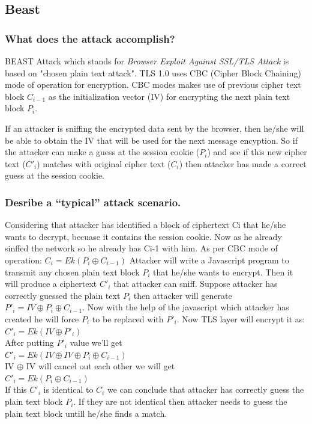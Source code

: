 \documentclass{article}
\begin{document}
\subsection{Beast}
\subsubsection{What does the attack accomplish?}

\indent \indent BEAST Attack which stands for {\it Browser Exploit Against SSL/TLS Attack} is based on "chosen plain text attack". TLS 1.0 uses CBC (Cipher Block Chaining) mode of operation for encryption. CBC modes makes use of previous cipher text block  $C_{i-1}$ as the initialization vector (IV) for encrypting the next plain text block $P_{i}$.

If an attacker is sniffing the encrypted data sent by the browser, then he/she will be able to obtain the IV that will be used for the next message encyption. So if the attacker can make a guess at the session cookie ($P_{i}$) and see if this new  cipher text ($C'_{i}$)
matches with original cipher text ($C_{i}$) then attacker has made a correct guess at the session cookie.

\subsubsection{Desribe a “typical” attack scenario.}
\indent \indent Considering that attacker has identified a  block of ciphertext Ci that he/she wants to decrypt, becuase it contains the session cookie. Now as he already sinffed the network so he already has Ci-1 with him.
As per CBC mode of operation: $C_i=Ek(P_i \oplus C_{i-1})$
Attacker will write a Javascript program to transmit any chosen plain text block $P_i$ that he/she wants to encrypt. Then it will produce a ciphertext $C'_i$ that attacker can sniff.
Suppose attacker has correctly guessed the plain text $P_i$ then attacker will generate $P'_i= IV \oplus P_i \oplus C_{i-1}$. Now with the help of the javascript which attacker has created he will force $P_i$ to be replaced with $P'_i$. Now TLS layer will encrypt it as: \\ 

\noindent $C'_i = Ek(IV \oplus P'_i)$ \\
After putting $P'_i$ value we'll get \\ 
$C'_i = Ek(IV \oplus IV \oplus P_i \oplus C_{i-1}) $\\ 
IV $\oplus$ IV will cancel out each other we will get\\
$C'_i = Ek(P_i \oplus C_{i-1})$ \\
If this $C'_i$ is identical to $C_i$ we can conclude that attacker has correctly guess the plain text block $P_i$. If they are not identical then attacker needs to guess the plain text block untill he/she finds a match.
\end{document}
